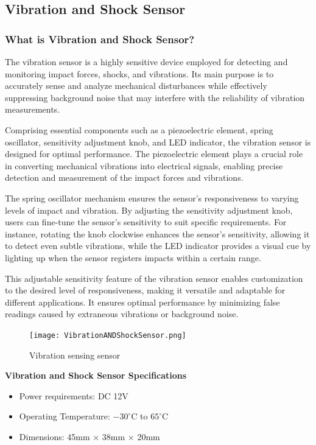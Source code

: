 \documentclass[
12pt,
oneside, 
onehalfspacing, 
nolistspacing, 
parskip, 
chapterinoneline, 
]{AASTCOMPUTER}
\begin{document}
\subsection{Vibration and Shock Sensor}

\subsubsection{What is Vibration and Shock Sensor?}

The vibration sensor is a highly sensitive device employed for detecting and monitoring impact forces, shocks, and vibrations. Its main purpose is to accurately sense and analyze mechanical disturbances while effectively suppressing background noise that may interfere with the reliability of vibration measurements.

Comprising essential components such as a piezoelectric element, spring oscillator, sensitivity adjustment knob, and LED indicator, the vibration sensor is designed for optimal performance. The piezoelectric element plays a crucial role in converting mechanical vibrations into electrical signals, enabling precise detection and measurement of the impact forces and vibrations.

The spring oscillator mechanism ensures the sensor's responsiveness to varying levels of impact and vibration. By adjusting the sensitivity adjustment knob, users can fine-tune the sensor's sensitivity to suit specific requirements. For instance, rotating the knob clockwise enhances the sensor's sensitivity, allowing it to detect even subtle vibrations, while the LED indicator provides a visual cue by lighting up when the sensor registers impacts within a certain range.

This adjustable sensitivity feature of the vibration sensor enables customization to the desired level of responsiveness, making it versatile and adaptable for different applications. It ensures optimal performance by minimizing false readings caused by extraneous vibrations or background noise.
\begin{figure}[!ht]
\centering
\texttt{[image: VibrationANDShockSensor.png]}
\caption[VibrationANDShockSensor]{Vibration sensing sensor}
\label{fig:TCU}
\end{figure}

\textbf{Vibration and Shock Sensor Specifications}
\begin{itemize}
\item Power requirements: DC 12V
\item Operating Temperature: $-30^\circ$C to $65^\circ$C
\item Dimensions: 45mm $\times$ 38mm $\times$ 20mm
\end{itemize}
\end{document}
